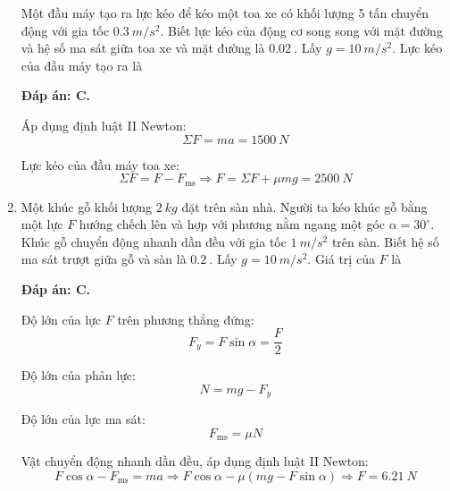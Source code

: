 \begin{enumerate}[label=\bfseries Câu \arabic*:]
	
	{Một đầu máy tạo ra lực kéo để kéo một toa xe có khối lượng 5 tấn chuyển động với gia tốc $\SI{0.3}{m/s^2}$. Biết lực kéo của động cơ song song với mặt đường và hệ số ma sát giữa toa xe và mặt đường là $\SI{0.02}{}$. Lấy $g=\SI{10}{m/s^2}$. Lực kéo của đầu máy tạo ra là
	}
	
	\hideall
	{	\textbf{Đáp án: C.}	
		
		Áp dụng định luật II Newton:
		$$\Sigma F = ma = \SI{1500}{N}$$
		
		Lực kéo của đầu máy toa xe:
		$$\Sigma F= F-F_\text{ms} \Rightarrow F = \Sigma F + \mu mg = \SI{2500}{N}$$
	}
	\item {}
	
	
	{Một khúc gỗ khối lượng $\SI{2}{kg}$ đặt trên sàn nhà. Người ta kéo khúc gỗ bằng một lực $F$ hướng chếch lên và hợp với phương nằm ngang một góc $\alpha=30^\circ$. Khúc gỗ chuyển động nhanh dần đều với gia tốc $\SI{1}{m/s^2}$ trên sàn. Biết hệ số ma sát trượt giữa gỗ và sàn là $\SI{0.2}{}$. Lấy $g=\SI{10}{m/s^2}$. Giá trị của $F$ là
	}
	
	\hideall
	{	\textbf{Đáp án: C.}
		
		Độ lớn của lực $F$ trên phương thẳng đứng:
		$$F_y = F \sin \alpha = \dfrac{F}{2}$$
		
		Độ lớn của phản lực:
		$$N=mg-F_y $$
		
		Độ lớn của lực ma sát:
		$$F_\text{ms} = \mu N$$
		
		Vật chuyển động nhanh dần đều, áp dụng định luật II Newton:
		$$F \cos \alpha - F_\text{ms} = ma \Rightarrow F \cos \alpha - \mu (mg - F \sin \alpha) \Rightarrow F = \SI{6.21}{N} $$
		
	}
\end{enumerate}
